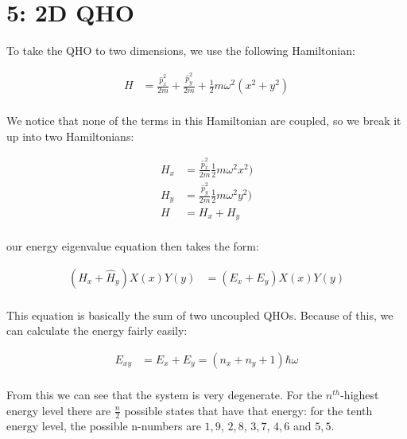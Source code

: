 \documentclass[10pt]{article} %
\begin{document}

\section{5: 2D QHO}
To take the QHO to two dimensions, we use the following Hamiltonian:

\begin{align*}
  H &= \frac{\hat{p}_x^2}{2m} + \frac{\hat{p}_y^2}{2m}
  + \frac{1}{2}m\omega^2\left(x^2+y^2\right)\\
\end{align*}

We notice that none of the terms in this Hamiltonian are coupled, so we break it
up into two Hamiltonians:

\begin{align*}
  H_x &= \frac{\hat{p}_x^2}{2m} \frac{1}{2}m\omega^2x^2)\\
  H_y &= \frac{\hat{p}_y^2}{2m} \frac{1}{2}m\omega^2y^2)\\
  H &= H_x + H_y\\
\end{align*}

our energy eigenvalue equation then takes the form:

\begin{align*}
  \left(\hat{H}_x + \hat{H}_y\right)X(x)Y(y) &= (E_x + E_y)X(x)Y(y)\\
\end{align*}

This equation is basically the sum of two uncoupled QHOs. Because of this, we
can calculate the energy fairly easily:

\begin{align*}
  E_{xy} &= E_x + E_y = \left(n_x+n_y + 1\right)\hbar\omega\\
\end{align*}

From this we can see that the system is very degenerate. For the $n^{th}$-highest
energy level there are $\frac{n}{2}$ possible states that have that energy: for
the tenth energy level, the possible n-numbers are $1,9$, $2,8$, $3,7$, $4,6$ and
$5,5$.\\
\end{document}
